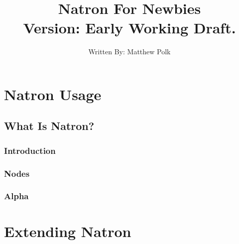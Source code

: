 \documentclass[letterpaper,12pt,oneside]{book}
\title{Natron For Newbies\\Version: Early Working Draft.}
\author{Written By: Matthew Polk}
\date{}
\begin{document}
\maketitle

\thispagestyle{empty}
\renewcommand{\contentsname}{Table of Contents}
\frontmatter
\tableofcontents
\mainmatter
\pagestyle{plain}
\part{Natron Usage}

\setcounter{page}{2}
\chapter{What Is Natron?}
\newpage

\section{Introduction}

\section{Nodes}

\section{Alpha}


\newpage

\part{Extending Natron}
\end{document}
